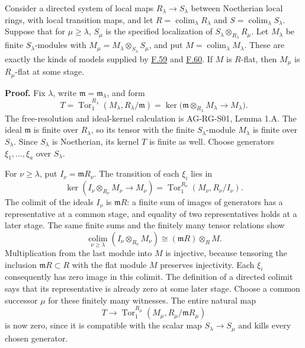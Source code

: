 \documentclass[11pt,a4paper,openany]{report}
\begin{document}
Consider a directed system of local maps \(R_\lambda\to S_\lambda\) between Noetherian local rings, with local transition maps, and let \(R=\operatorname*{colim}_\lambda R_\lambda\) and \(S=\operatorname*{colim}_\lambda S_\lambda\). Suppose that for \(\mu\geq\lambda\), \(S_\mu\) is the specified localization of \(S_\lambda\otimes_{R_\lambda}R_\mu\). Let \(M_\lambda\) be finite \(S_\lambda\)-modules with \(M_\mu=M_\lambda\otimes_{S_\lambda}S_\mu\), and put \(M=\operatorname*{colim}_\lambda M_\lambda\). These are exactly the kinds of models supplied by \hyperref[AG-RG-S05-algebra-lemma-limit-essentially-finite-presentation]{F.59} and \hyperref[AG-RG-S05-algebra-lemma-limit-module-essentially-finite-presentation]{F.60}. If \(M\) is \(R\)-flat, then \(M_\mu\) is \(R_\mu\)-flat at some stage.

\textbf{Proof.} Fix \(\lambda\), write \(\mathfrak m=\mathfrak m_\lambda\), and form \[T=\operatorname{Tor}_1^{R_\lambda}(M_\lambda,R_\lambda/\mathfrak m)
=\ker\bigl(\mathfrak m\otimes_{R_\lambda}M_\lambda\longrightarrow M_\lambda\bigr).\] The free-resolution and ideal-kernel calculation is AG-RG-S01, Lemma 1.A. The ideal \(\mathfrak m\) is finite over \(R_\lambda\), so its tensor with the finite \(S_\lambda\)-module \(M_\lambda\) is finite over \(S_\lambda\). Since \(S_\lambda\) is Noetherian, its kernel \(T\) is finite as well. Choose generators \(\xi_1,\ldots,\xi_a\) over \(S_\lambda\).

For \(\nu\geq\lambda\), put \(I_\nu=\mathfrak mR_\nu\). The transition of each \(\xi_i\) lies in \[\ker(I_\nu\otimes_{R_\nu}M_\nu\longrightarrow M_\nu)
=\operatorname{Tor}_1^{R_\nu}(M_\nu,R_\nu/I_\nu).\] The colimit of the ideals \(I_\nu\) is \(\mathfrak mR\): a finite sum of images of generators has a representative at a common stage, and equality of two representatives holds at a later stage. The same finite sums and the finitely many tensor relations show \[\operatorname*{colim}_{\nu\geq\lambda}
(I_\nu\otimes_{R_\nu}M_\nu)
\cong(\mathfrak mR)\otimes_R M.\] Multiplication from the last module into \(M\) is injective, because tensoring the inclusion \(\mathfrak mR\subset R\) with the flat module \(M\) preserves injectivity. Each \(\xi_i\) consequently has zero image in this colimit. The definition of a directed colimit says that its representative is already zero at some later stage. Choose a common successor \(\mu\) for these finitely many witnesses. The entire natural map \[T\longrightarrow\operatorname{Tor}_1^{R_\mu}(M_\mu,R_\mu/\mathfrak mR_\mu)\] is now zero, since it is compatible with the scalar map \(S_\lambda\to S_\mu\) and kills every chosen generator.
\end{document}
